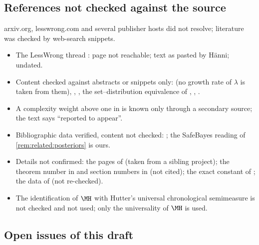 \subsection{References not checked against the source}\label{app:verification:refs}

arxiv.org, lesswrong.com and several publisher hosts did not resolve; literature was checked by web-search snippets.
\begin{itemize}
\item The LessWrong thread \citep{hanni2026lesswrong}: page not reachable; text as pasted by H\"anni; undated.
\item Content checked against abstracts or snippets only: \citet{grunwald2007suboptimal,zhu2025quantifying,zhu2026overfitting} (no growth rate of $\lambda$ is taken from them), \citet{vereshchagin2010rate}, \citet{milovanov2016algorithmic}, the set--distribution equivalence of \citet{vereshchagin2017algorithmic}, \citet{wenzel2020good}, \citet{poland2005asymptotics}.
\item A complexity weight above one in \citet{barron1991minimum} is known only through a secondary source; the text says ``reported to appear''.
\item Bibliographic data verified, content not checked: \citet{bissiri2016general,bhattacharya2019fractional,grunwald2012safe,grunwald2017inconsistency,zhang2006epsilon,gacs2001algorithmic,vereshchagin2004kolmogorov,koppel1987complexity,koppel1991almost,vitanyi2006meaningful,antunes2009sophistication}; the SafeBayes reading of \cref{rem:related:posteriors} is ours.
\item Details not confirmed: the pages of \citet{kushilevitz1993learning} (taken from a sibling project); the theorem number in \citet{hoeffding1963probability} and section numbers in \citet{li2008introduction} (not cited); the exact constant of \citet{solomonoff1978complexity}; the data of \citet{ville1939etude} (not re-checked).
\item The identification of $\MH$ with Hutter's universal chronological semimeasure is not checked and not used; only the universality of $\MH$ is used.
\end{itemize}

\subsection{Open issues of this draft}\label{app:verification:open}

